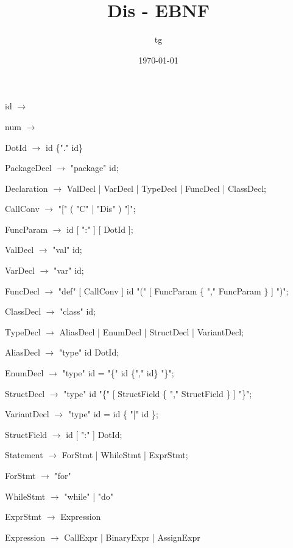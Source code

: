 \documentclass{article}
\title{Dis - EBNF}
\author{tg}
\date{\today}
\newcommand{\is}[0]{{$\rightarrow$ }}
\begin{document}
\begin{list}{}{}
\item id \is 
\item num \is
\item DotId \is id \{"." id\}

\item PackageDecl \is "package" id;

\item Declaration \is ValDecl | VarDecl | TypeDecl | FuncDecl | ClassDecl;

\item CallConv \is "[" ( "C" | "Dis" ) "]";
\item FuncParam \is id [ ":" ] [ DotId ];

\item ValDecl \is "val" id;
\item VarDecl \is "var" id;
\item FuncDecl \is "def" [  CallConv ] id "(" [ FuncParam  \{ "," FuncParam \} ] ")";
\item ClassDecl \is "class" id;


\item TypeDecl \is AliasDecl | EnumDecl | StructDecl | VariantDecl;
\item AliasDecl \is "type" id DotId;
\item EnumDecl  \is "type" id = "\{" id \{"," id\} "\}";
\item StructDecl \is  "type" id "\{" [ StructField \{ "," StructField \} ] "\}";
\item VariantDecl \is "type" id = id \{ "|" id \};

\item StructField \is id [ ":" ] DotId;

\item Statement \is ForStmt | WhileStmt | ExprStmt;
\item ForStmt \is "for"
\item WhileStmt \is "while" | "do"
\item ExprStmt \is Expression


\item Expression \is CallExpr | BinaryExpr | AssignExpr


\end{list}
\end{document}
